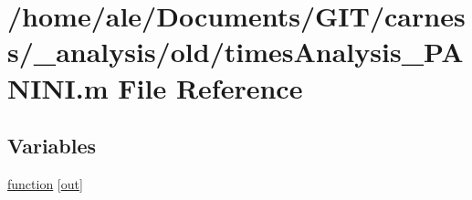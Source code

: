\hypertarget{a00032}{\section{/home/ale/\-Documents/\-G\-I\-T/carness/\-\_\-analysis/old/times\-Analysis\-\_\-\-P\-A\-N\-I\-N\-I.m File Reference}
\label{a00032}
}
\subsection*{Variables}
\begin{DoxyCompactItemize}
\item 
\hyperlink{a00032_a370f3dd25136a73d619eba0aa2e3bb4b}{function} \mbox{[}\hyperlink{a00022_a34c820385e9209f49c18739329ad9206}{out}\mbox{]}
\end{DoxyCompactItemize}



